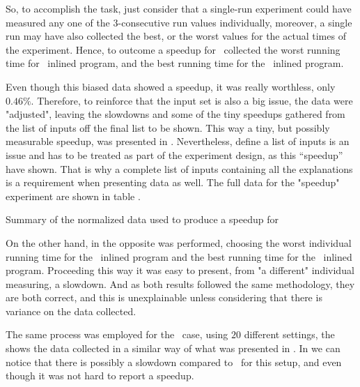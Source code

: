 So, to accomplish the task, just consider that a single-run experiment could have measured any one of the $3$-consecutive run values individually, moreover, a single run may have also collected the best, or the worst values for the actual times of the experiment. Hence, to outcome a speedup for \FDI\, collected the worst running time for \llvm\ inlined program, and the best running time for the \FDI\ inlined program.

Even though this biased data showed a speedup, it was really worthless, only $0.46 \%$. Therefore, to reinforce that the input set is also a big issue, the data were "adjusted", leaving the slowdowns and some of the tiny speedups gathered from the list of inputs off the final list to be shown. This way a tiny, but possibly measurable speedup, was presented in . Nevertheless, define a list of inputs is an issue and has to be treated as part of the experiment design, as this ``speedup'' have shown. That is why a complete list of inputs containing all the explanations is a requirement when presenting data as well. The full data for the "speedup" experiment are shown in table .

\begin{table}
  \centering
  \begin{tiny}
  
  \end{tiny}
  \caption{Summary of the normalized data used to produce a speedup for \bzip}
  \label{tab:fullexp}
\end{table}

On the other hand, in  the opposite was performed, choosing the worst individual running time for the \FDI\ inlined program and the best running time for the \llvm\ inlined program. Proceeding this way it was easy to present, from "a different" individual measuring, a slowdown. And as both results followed the same methodology, they are both correct, and this is unexplainable unless considering that there is variance on the data collected.

The same process was employed for the \gzip\ case, using $20$ different settings, the  shows the data collected in a similar way of what was presented in . In  we can notice that there is possibly a slowdown compared to \llvm\ for this setup, and even though it was not hard to report a speedup.

